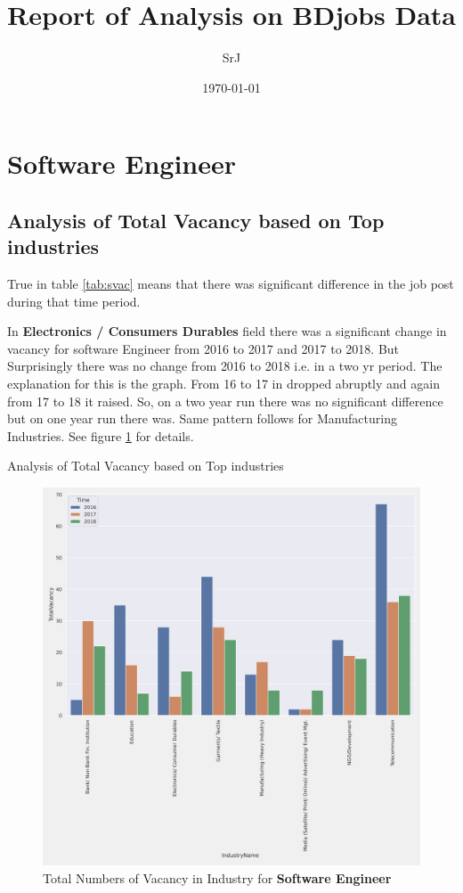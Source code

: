 \documentclass{article}
\title{Report of Analysis on BDjobs Data}
\author{SrJ}
\date{\today}
\begin{document}
	\maketitle
	
\section{Software Engineer}
\subsection{Analysis of Total Vacancy based on Top industries}
True in table \ref{tab:svac} means that there was significant difference in the job post during that time period.

In \textbf{Electronics / Consumers Durables} field there was a significant change in vacancy for software Engineer from 2016 to 2017 and 2017 to 2018. But Surprisingly there was no change from 2016 to 2018 i.e. in a two yr period. The explanation for this is the graph. From 16 to 17 in dropped abruptly and again from 17 to 18 it raised. So, on a two year run there was no significant difference but on one year run there was. Same pattern follows for Manufacturing Industries. See figure \ref{fig:svac} for details.

\begin{table}[!htb]
	\centering
	\caption{Analysis of Total Vacancy based on Top industries}
	\label{tab:svac}
\end{table}


\begin{figure}[!h]
	\centering
	\label{fig:svac}
	\caption{Total Numbers of Vacancy in Industry for \textbf{Software Engineer}}
	\includegraphics[scale=0.5]{Graphs/Software Engineer_TotalVacancy_ttest.png}
\end{figure}
\end{document}

